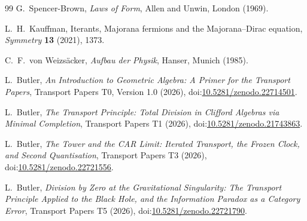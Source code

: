 \documentclass[11pt]{article}
\theoremstyle{plain}
\theoremstyle{definition}
\theoremstyle{plain}
\theoremstyle{definition}
\begin{document}
\begin{thebibliography}{99}
G.~Spencer-Brown,
\emph{Laws of Form},
Allen and Unwin, London (1969).

L.~H.~Kauffman,
Iterants, Majorana fermions and the Majorana--Dirac equation,
\emph{Symmetry} \textbf{13} (2021), 1373.

C.~F.~von Weizs\"acker,
\emph{Aufbau der Physik},
Hanser, Munich (1985).

L.~Butler,
\emph{An Introduction to Geometric Algebra: A Primer for the Transport Papers},
Transport Papers T0, Version 1.0 (2026), doi:\href{https://doi.org/10.5281/zenodo.22714501}{10.5281/zenodo.22714501}.

L.~Butler,
\emph{The Transport Principle: Total Division in Clifford Algebras via Minimal Completion},
Transport Papers T1 (2026), doi:\href{https://doi.org/10.5281/zenodo.21743863}{10.5281/zenodo.21743863}.

L.~Butler,
\emph{The Tower and the CAR Limit: Iterated Transport, the Frozen Clock, and Second Quantisation},
Transport Papers T3 (2026), doi:\href{https://doi.org/10.5281/zenodo.22721556}{10.5281/zenodo.22721556}.

L.~Butler,
\emph{Division by Zero at the Gravitational Singularity: The Transport Principle Applied to the Black Hole, and the Information Paradox as a Category Error},
Transport Papers T5 (2026), doi:\href{https://doi.org/10.5281/zenodo.22721790}{10.5281/zenodo.22721790}.

\end{thebibliography}
\end{document}
